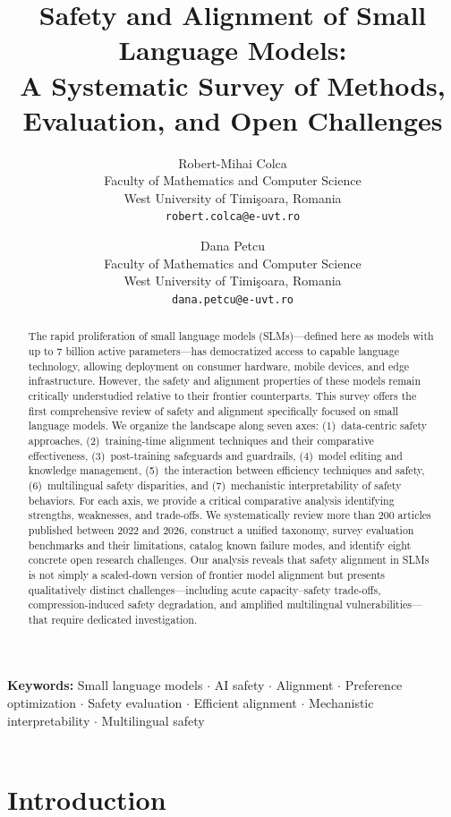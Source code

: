 \documentclass[12pt,a4paper]{article}
\title{\textbf{Safety and Alignment of Small Language Models:}\\ \textbf{A Systematic Survey of Methods, Evaluation, and Open Challenges}}
\author{
  Robert-Mihai Colca \\
  \small Faculty of Mathematics and Computer Science \\
  \small West University of Timi\c{s}oara, Romania \\
  \small \texttt{robert.colca@e-uvt.ro}
  \and
  Dana Petcu \\
  \small Faculty of Mathematics and Computer Science \\
  \small West University of Timi\c{s}oara, Romania \\
  \small \texttt{dana.petcu@e-uvt.ro}
}
\date{}
\begin{document}
\maketitle

\begin{abstract}
\noindent The rapid proliferation of small language models (SLMs)---defined here as models with up to 7 billion active parameters---has democratized access to capable language technology, allowing deployment on consumer hardware, mobile devices, and edge infrastructure. However, the safety and alignment properties of these models remain critically understudied relative to their frontier counterparts. This survey offers the first comprehensive review of safety and alignment specifically focused on small language models. We organize the landscape along seven axes: (1)~data-centric safety approaches, (2)~training-time alignment techniques and their comparative effectiveness, (3)~post-training safeguards and guardrails, (4)~model editing and knowledge management, (5)~the interaction between efficiency techniques and safety, (6)~multilingual safety disparities, and (7)~mechanistic interpretability of safety behaviors. For each axis, we provide a critical comparative analysis identifying strengths, weaknesses, and trade-offs. We systematically review more than 200 articles published between 2022 and 2026, construct a unified taxonomy, survey evaluation benchmarks and their limitations, catalog known failure modes, and identify eight concrete open research challenges. Our analysis reveals that safety alignment in SLMs is not simply a scaled-down version of frontier model alignment but presents qualitatively distinct challenges---including acute capacity--safety trade-offs, compression-induced safety degradation, and amplified multilingual vulnerabilities---that require dedicated investigation.
\end{abstract}

\smallskip
\noindent\textbf{Keywords:} Small language models $\cdot$ AI safety $\cdot$ Alignment $\cdot$ Preference optimization $\cdot$ Safety evaluation $\cdot$ Efficient alignment $\cdot$ Mechanistic interpretability $\cdot$ Multilingual safety \\
\\

\section{Introduction}\label{sec:intro}
\end{document}
